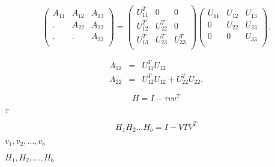 {\newpage\clearpage
{}%
\begin{displaymath}
\left( \begin{array}{ccc}
A_{11} & A_{12} & A_{13}\\
.      & A_{22} & A_{23}\\
.      & .      & A_{33}\\
\end{array} \right) =
\left( \begin{array}{ccc}
U_{11}^T & 0 & 0\\
U_{12}^T & U_{22}^T & 0\\
U_{13}^T & U_{23}^T & U_{33}^T\\
\end{array} \right)
\left( \begin{array}{ccc}
U_{11} & U_{12} & U_{13}\\
0 & U_{22} & U_{23}\\
0 & 0 & U_{33}\\
\end{array} \right).
\end{displaymath}%
\lthtmldisplayZ
\lthtmlcheckvsize\clearpage}

{\newpage\clearpage
{}%
\begin{eqnarray*}
A_{12} & = & U_{11}^T U_{12} \\
A_{22} & = & U_{12}^T U_{12} + U_{22}^T U_{22}.
\end{eqnarray*}%
\lthtmldisplayZ
\lthtmlcheckvsize\clearpage}

{\newpage\clearpage
{}%
\begin{displaymath}
H = I - \tau v v^T
\end{displaymath}%
\lthtmldisplayZ
\lthtmlcheckvsize\clearpage}

{\newpage\clearpage
{}%
$\tau$%
\lthtmlinlinemathZ
\lthtmlcheckvsize\clearpage}

{\newpage\clearpage
{}%
\begin{displaymath}
        H_1 H_2 \ldots H_b = I - V T V^T
\end{displaymath}%
\lthtmldisplayZ
\lthtmlcheckvsize\clearpage}

{\newpage\clearpage
{}%
$v_1, v_2, \ldots , v_b$%
\lthtmlinlinemathZ
\lthtmlcheckvsize\clearpage}

{\newpage\clearpage
{}%
$H_1, H_2,
\ldots , H_b$%
\lthtmlinlinemathZ
\lthtmlcheckvsize\clearpage}

